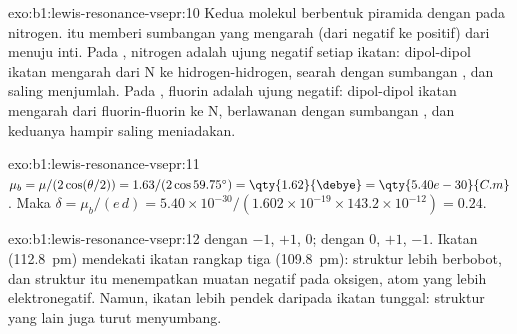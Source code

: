 \begin{solution}{exo:b1:lewis-resonance-vsepr:10}
Kedua molekul berbentuk piramida dengan  pada
nitrogen.  itu memberi sumbangan yang mengarah (dari
negatif ke positif) dari  menuju inti. Pada ,
nitrogen adalah ujung negatif setiap ikatan: dipol-dipol ikatan mengarah
dari N ke hidrogen-hidrogen, searah dengan sumbangan , dan
saling menjumlah. Pada , fluorin adalah ujung negatif: dipol-dipol
ikatan mengarah dari fluorin-fluorin ke N, berlawanan dengan sumbangan
, dan keduanya hampir saling meniadakan.
\end{solution}

\begin{solution}{exo:b1:lewis-resonance-vsepr:11}
$\mu_b = \mu/(2\cos(\theta/2)) = 1.63/(2\cos 59.75^\circ) =
\qty{1.62}{\debye} = \qty{5.40e-30}{C.m}$. Maka $\delta = \mu_b/(e\,d) =
5.40 \times 10^{-30}/(1.602 \times 10^{-19} \times 143.2 \times 10^{-12})
= 0.24$.
\end{solution}

\begin{solution}{exo:b1:lewis-resonance-vsepr:12}
 dengan  $-1$, $+1$, $0$;  dengan $0$,
$+1$, $-1$. Ikatan  (\qty{112.8}{pm}) mendekati ikatan rangkap
tiga  (\qty{109.8}{pm}): struktur  lebih berbobot, dan
struktur itu menempatkan muatan negatif pada oksigen, atom yang lebih
elektronegatif. Namun, ikatan  lebih pendek daripada ikatan
tunggal: struktur yang lain juga turut menyumbang.
\end{solution}

